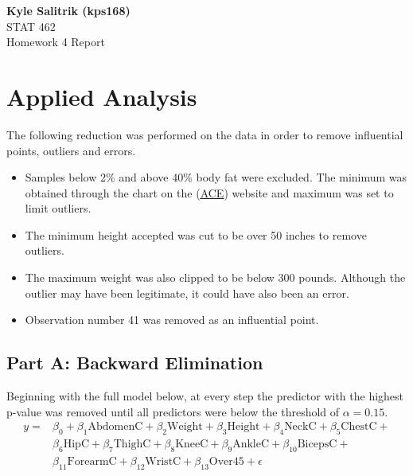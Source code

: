 \documentclass[a4paper, 11pt]{article}
\begin{document}
\graphicspath{{./figures/}}
\noindent
\large\textbf{Kyle Salitrik (kps168)} \\
\normalsize STAT 462\\
\large{Homework 4 Report} \hfill 
\section*{Applied Analysis}
The following reduction was performed on the data in order to remove influential points, outliers and errors.
\begin{itemize}
	\setlength\itemsep{0em}
	\item Samples below 2\% and above 40\% body fat were excluded. The minimum was obtained through the chart on the (\href{''https://www.acefitness.org/acefit/healthy-living-article/60/112/what-are-the-guidelines-for-percentage-of-body-fat-loss''}{\underline{ACE}}) website and maximum was set to limit outliers.
	\item The minimum height accepted was cut to be over 50 inches to remove outliers.
	\item The maximum weight was also clipped to be below 300 pounds. Although the outlier may have been legitimate, it could have also been an error.
	\item Observation number 41 was removed as an influential point.
\end{itemize}

\subsection*{Part A: Backward Elimination}
Beginning with the full model below, at every step the predictor with the highest p-value was removed until all predictors were below the threshold of $\alpha = 0.15$. 
\begin{align*}
	y = & \beta_0 + \beta_1\text{AbdomenC} + \beta_2\text{Weight} + \beta_3\text{Height} + \beta_4\text{NeckC} + \beta_5\text{ChestC} + \\
	& \beta_6\text{HipC} + \beta_7\text{ThighC} + \beta_8\text{KneeC} + \beta_9\text{AnkleC} + \beta_{10}\text{BicepsC} +  \\ 
	&\beta_{11}\text{ForearmC} + \beta_{12}\text{WristC} +\beta_{13}\text{Over45}+ \epsilon
\end{align*}
\end{document}
